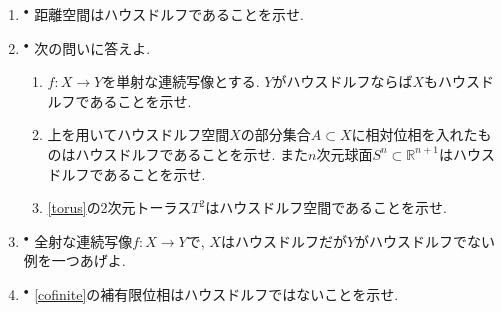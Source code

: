 \documentclass[dvipdfmx,a4paper,11pt]{article}
\newcommand{\R}{\mathbb{R}}
\theoremstyle{definition}
\begin{document}
\begin{enumerate}[label=\textbf{問}\ref*{sec-Hausdorff}.\arabic*]
\setlength{\parskip}{0cm}
  \setlength{\itemsep}{7pt} 

\item $^\bullet$ 距離空間はハウスドルフであることを示せ. 

\item $^{\bullet}$ 次の問いに答えよ.
\begin{enumerate}
	\setlength{\parskip}{0cm} 
  \setlength{\itemsep}{0pt} 
\item $f : X \rightarrow Y$を単射な連続写像とする. $Y$がハウスドルフならば$X$もハウスドルフであることを示せ. 
\item  上を用いてハウスドルフ空間$X$の部分集合$A \subset X$に相対位相を入れたものはハウスドルフであることを示せ. また$n$次元球面$S^n \subset \R^{n+1}$はハウスドルフであることを示せ.
\item \ref{torus}の2次元トーラス$T^2$はハウスドルフ空間であることを示せ. 
\end{enumerate}



 
 \item $^{\bullet}$ 全射な連続写像$f : X \rightarrow Y$で, $X$はハウスドルフだが$Y$がハウスドルフでない例を一つあげよ. 
 
 \item $^\bullet$ \ref{cofinite}の補有限位相はハウスドルフではないことを示せ.




\end{enumerate}
\end{document}
